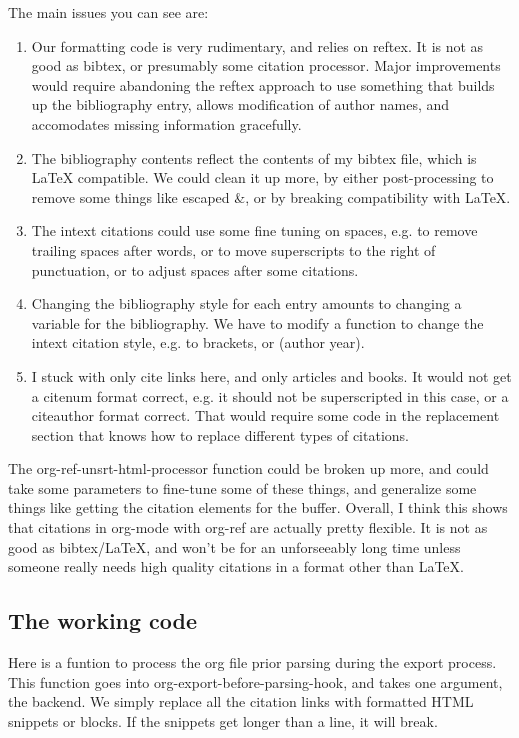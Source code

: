 \documentclass[11pt]{article}
\begin{document}
The main issues you can see are:
\begin{enumerate}
\item Our formatting code is very rudimentary, and relies on reftex. It is not as good as bibtex, or presumably some citation processor. Major improvements would require abandoning the reftex approach to use something that builds up the bibliography entry, allows modification of author names, and accomodates missing information gracefully.
\item The bibliography contents reflect the contents of my bibtex file, which is \LaTeX{} compatible. We could clean it up more, by either post-processing to remove some things like escaped \&, or by breaking compatibility with \LaTeX{}.
\item The intext citations could use some fine tuning on spaces, e.g. to remove trailing spaces after words, or to move superscripts to the right of punctuation, or to adjust spaces after some citations.
\item Changing the bibliography style for each entry amounts to changing a variable for the bibliography. We have to modify a function to change the intext citation style, e.g. to brackets, or (author year).
\item I stuck with only cite links here, and only articles and books. It would not get a citenum format correct, e.g. it should not be superscripted in this case, or a citeauthor format correct. That would require some code in the replacement section that knows how to replace different types of citations.
\end{enumerate}

The  org-ref-unsrt-html-processor function could be broken up more, and could take some parameters to fine-tune some of these things, and generalize some things like getting the citation elements for the buffer. Overall, I think this shows that citations in org-mode with org-ref are actually pretty flexible. It is not as good as bibtex/\LaTeX{}, and won't be for an unforseeably long time unless someone really needs high quality citations in a format other than \LaTeX{}.





\subsection{The working code}
\label{sec-1-1}
Here is a funtion to process the org file prior parsing during the export process. This function goes into org-export-before-parsing-hook, and takes one argument, the backend. We simply replace all the citation links with formatted HTML snippets or blocks. If the snippets get longer than a line, it will break.
\end{document}
